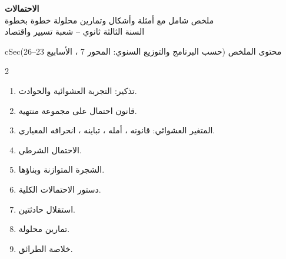 \documentclass[12pt,a4paper]{article}
\newenvironment{BOX}[2]{\begin{otherlanguage}{english}\begin{arbox}{#1}{#2}}{\end{arbox}\end{otherlanguage}}
\newenvironment{LTR}{\begin{otherlanguage}{english}}{\end{otherlanguage}}
\begin{document}
\begin{LTR}
\begin{tcolorbox}[enhanced,colback=cSec!10,colframe=cSec!40,arc=3mm,halign=center,boxrule=0.6pt,top=12pt,bottom=12pt,before upper={\selectlanguage{arabic}}]
{\color{cSec}\fontsize{28}{34}\selectfont\bfseries الاحتمالات}\\[8pt]
{\color{cSec!80!black}\large ملخص شامل مع أمثلة وأشكال وتمارين محلولة خطوة بخطوة}\\[5pt]
{\color{cSec!80!black}\large السنة الثالثة ثانوي -- شعبة تسيير واقتصاد}
\end{tcolorbox}
\end{LTR}

\begin{BOX}{cSec}{محتوى الملخص (حسب البرنامج والتوزيع السنوي: المحور 7 ، الأسابيع 23--26)}
\begin{multicols}{2}
\begin{enumerate}[label=\textbf{\arabic*.}]
\item تذكير: التجربة العشوائية والحوادث.
\item قانون احتمال على مجموعة منتهية.
\item المتغير العشوائي: قانونه ، أمله ، تباينه ، انحرافه المعياري.
\item الاحتمال الشرطي.
\item الشجرة المتوازنة وبناؤها.
\item دستور الاحتمالات الكلية.
\item استقلال حادثتين.
\item تمارين محلولة.
\item خلاصة الطرائق.
\end{enumerate}
\end{multicols}
\end{BOX}

\end{document}
